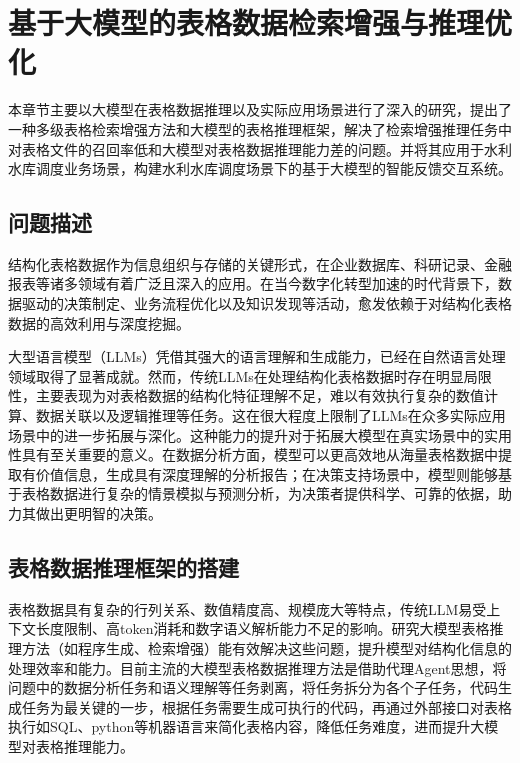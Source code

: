\chapter{基于大模型的表格数据检索增强与推理优化}
\label{cha:第四章}
本章节主要以大模型在表格数据推理以及实际应用场景进行了深入的研究，提出了一种多级表格检索增强方法和大模型的表格推理框架，解决了检索增强推理任务中对表格文件的召回率低和大模型对表格数据推理能力差的问题。并将其应用于水利水库调度业务场景，构建水利水库调度场景下的基于大模型的智能反馈交互系统。
\section{问题描述}
结构化表格数据作为信息组织与存储的关键形式，在企业数据库、科研记录、金融报表等诸多领域有着广泛且深入的应用。在当今数字化转型加速的时代背景下，数据驱动的决策制定、业务流程优化以及知识发现等活动，愈发依赖于对结构化表格数据的高效利用与深度挖掘。

大型语言模型（LLMs）凭借其强大的语言理解和生成能力，已经在自然语言处理领域取得了显著成就。然而，传统LLMs在处理结构化表格数据时存在明显局限性，主要表现为对表格数据的结构化特征理解不足，难以有效执行复杂的数值计算、数据关联以及逻辑推理等任务。这在很大程度上限制了LLMs在众多实际应用场景中的进一步拓展与深化。这种能力的提升对于拓展大模型在真实场景中的实用性具有至关重要的意义。在数据分析方面，模型可以更高效地从海量表格数据中提取有价值信息，生成具有深度理解的分析报告；在决策支持场景中，模型则能够基于表格数据进行复杂的情景模拟与预测分析，为决策者提供科学、可靠的依据，助力其做出更明智的决策。
\section{表格数据推理框架的搭建}
表格数据具有复杂的行列关系、数值精度高、规模庞大等特点，传统LLM易受上下文长度限制、高token消耗和数字语义解析能力不足的影响。研究大模型表格推理方法（如程序生成、检索增强）能有效解决这些问题，提升模型对结构化信息的处理效率和能力。目前主流的大模型表格数据推理方法是借助代理Agent思想，将问题中的数据分析任务和语义理解等任务剥离，将任务拆分为各个子任务，代码生成任务为最关键的一步，根据任务需要生成可执行的代码，再通过外部接口对表格执行如SQL、python等机器语言来简化表格内容，降低任务难度，进而提升大模型对表格推理能力。

